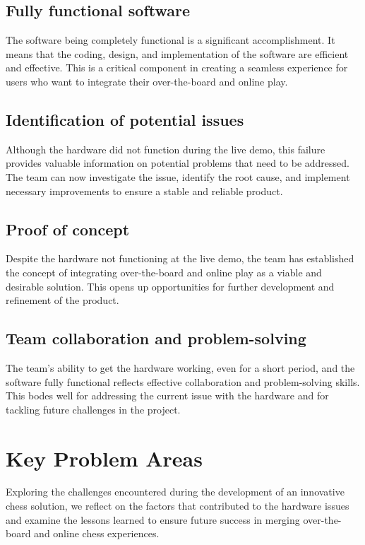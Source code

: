 \documentclass{article}
\begin{document}
\subsection{Fully functional software}
The software being completely functional is a significant accomplishment. It means that the coding, design, and implementation of the software are efficient and effective. This is a critical component in creating a seamless experience for users who want to integrate their over-the-board and online play.

\subsection{Identification of potential issues}
Although the hardware did not function during the live demo, this failure provides valuable information on potential problems that need to be addressed. The team can now investigate the issue, identify the root cause, and implement necessary improvements to ensure a stable and reliable product.

\subsection{Proof of concept}
Despite the hardware not functioning at the live demo, the team has established the concept of integrating over-the-board and online play as a viable and desirable solution. This opens up opportunities for further development and refinement of the product.

\subsection{Team collaboration and problem-solving}
The team's ability to get the hardware working, even for a short period, and the software fully functional reflects effective collaboration and problem-solving skills. This bodes well for addressing the current issue with the hardware and for tackling future challenges in the project.

\section{Key Problem Areas}
 
Exploring the challenges encountered during the development of an innovative chess solution, we reflect on the factors that contributed to the hardware issues and examine the lessons learned to ensure future success in merging over-the-board and online chess experiences.
\end{document}
